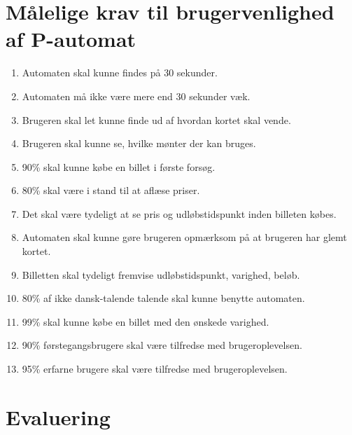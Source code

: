 \documentclass[10pt]{article}
\begin{document}
\section*{Målelige krav til brugervenlighed af P-automat}

\begin{enumerate}
\item Automaten skal kunne findes på 30 sekunder.
\item Automaten må ikke være mere end 30 sekunder væk.

\item Brugeren skal let kunne finde ud af hvordan kortet skal vende.
\item Brugeren skal kunne se, hvilke mønter der kan bruges.

\item 90\% skal kunne købe en billet i første forsøg.
\item 80\% skal være i stand til at aflæse priser.
\item Det skal være tydeligt at se pris og udløbstidspunkt inden billeten
  købes.
\item Automaten skal kunne gøre brugeren opmærksom på at brugeren har
  glemt kortet.

\item Billetten skal tydeligt fremvise udløbstidspunkt, varighed, beløb.
\item 80\% af ikke dansk-talende talende skal kunne benytte automaten.
\item 99\% skal kunne købe en billet med den ønskede varighed.
\item 90\% førstegangsbrugere skal være tilfredse med brugeroplevelsen.
\item 95\% erfarne brugere skal være tilfredse med brugeroplevelsen.
\end{enumerate}

\section*{Evaluering}
\end{document}
